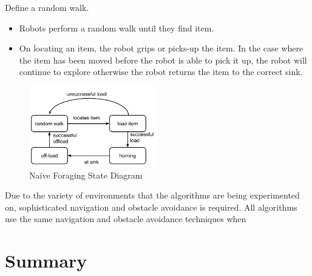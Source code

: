 Define a random walk. \cite{54}
\begin{itemize}
	\item Robots perform a random walk until they find item.
	\item On locating an item, the robot grips or picks-up the item. In the case where the item has been moved before the robot is able to pick it up, the robot will continue to explore otherwise the robot returns the item to the correct sink.
\end{itemize}
\begin{figure}
	\centering
	\includegraphics[width=0.5\textwidth]{chapters/chapter3/figures/NaiveForaging.pdf}
	\caption{Na\"ive Foraging State Diagram}
\end{figure}



Due to the variety of environments that the algorithms are being experimented on, sophisticated navigation and obstacle avoidance is required. All algorithms use the same navigation and obstacle avoidance techniques when 

\section{Summary}
\label{sec:second:summary}


